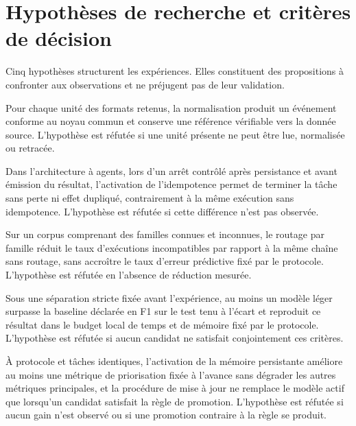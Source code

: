 \section*{Hypothèses de recherche et critères de décision}


Cinq hypothèses structurent les expériences. Elles constituent des propositions à confronter aux observations et ne préjugent pas de leur validation.

\begin{description}[leftmargin=1.6cm, style=nextline]

    \item[\textbf{H1.}]
    Pour chaque unité des formats retenus, la normalisation produit un événement conforme au noyau commun et conserve une référence vérifiable vers la donnée source. L'hypothèse est réfutée si une unité présente ne peut être lue, normalisée ou retracée.

    \item[\textbf{H2.}]
    Dans l'architecture à agents, lors d'un arrêt contrôlé après persistance et avant émission du résultat, l'activation de l'idempotence permet de terminer la tâche sans perte ni effet dupliqué, contrairement à la même exécution sans idempotence. L'hypothèse est réfutée si cette différence n'est pas observée.

    \item[\textbf{H3.}]
    Sur un corpus comprenant des familles connues et inconnues, le routage par famille réduit le taux d'exécutions incompatibles par rapport à la même chaîne sans routage, sans accroître le taux d'erreur prédictive fixé par le protocole. L'hypothèse est réfutée en l'absence de réduction mesurée.

    \item[\textbf{H4.}]
    Sous une séparation stricte fixée avant l'expérience, au moins un modèle léger surpasse la baseline déclarée en F1 sur le test tenu à l'écart et reproduit ce résultat dans le budget local de temps et de mémoire fixé par le protocole. L'hypothèse est réfutée si aucun candidat ne satisfait conjointement ces critères.

    \item[\textbf{H5.}]
    À protocole et tâches identiques, l'activation de la mémoire persistante améliore au moins une métrique de priorisation fixée à l'avance sans dégrader les autres métriques principales, et la procédure de mise à jour ne remplace le modèle actif que lorsqu'un candidat satisfait la règle de promotion. L'hypothèse est réfutée si aucun gain n'est observé ou si une promotion contraire à la règle se produit.

\end{description}

